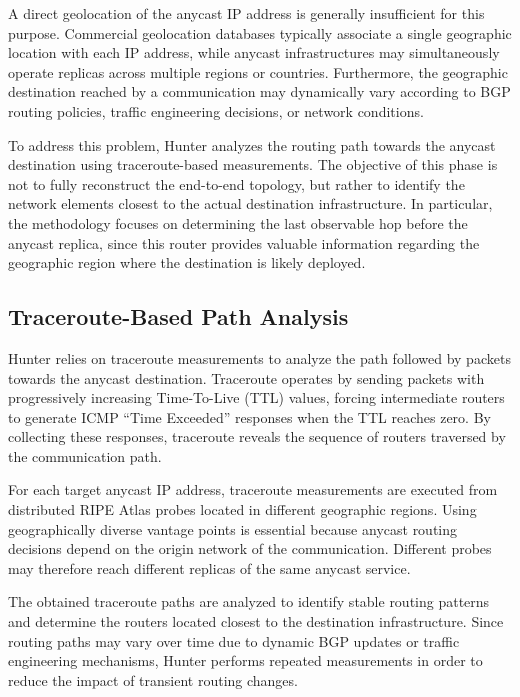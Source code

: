 A direct geolocation of the anycast IP address is generally insufficient for this purpose. Commercial geolocation databases typically associate a single geographic location with each IP address, while anycast infrastructures may simultaneously operate replicas across multiple regions or countries. Furthermore, the geographic destination reached by a communication may dynamically vary according to BGP routing policies, traffic engineering decisions, or network conditions.

To address this problem, Hunter analyzes the routing path towards the anycast destination using traceroute-based measurements. The objective of this phase is not to fully reconstruct the end-to-end topology, but rather to identify the network elements closest to the actual destination infrastructure. In particular, the methodology focuses on determining the last observable hop before the anycast replica, since this router provides valuable information regarding the geographic region where the destination is likely deployed.

\subsection{Traceroute-Based Path Analysis}

Hunter relies on traceroute measurements to analyze the path followed by packets towards the anycast destination. Traceroute operates by sending packets with progressively increasing Time-To-Live (TTL) values, forcing intermediate routers to generate ICMP ``Time Exceeded'' responses when the TTL reaches zero. By collecting these responses, traceroute reveals the sequence of routers traversed by the communication path.

For each target anycast IP address, traceroute measurements are executed from distributed RIPE Atlas probes located in different geographic regions. Using geographically diverse vantage points is essential because anycast routing decisions depend on the origin network of the communication. Different probes may therefore reach different replicas of the same anycast service.

The obtained traceroute paths are analyzed to identify stable routing patterns and determine the routers located closest to the destination infrastructure. Since routing paths may vary over time due to dynamic BGP updates or traffic engineering mechanisms, Hunter performs repeated measurements in order to reduce the impact of transient routing changes.

